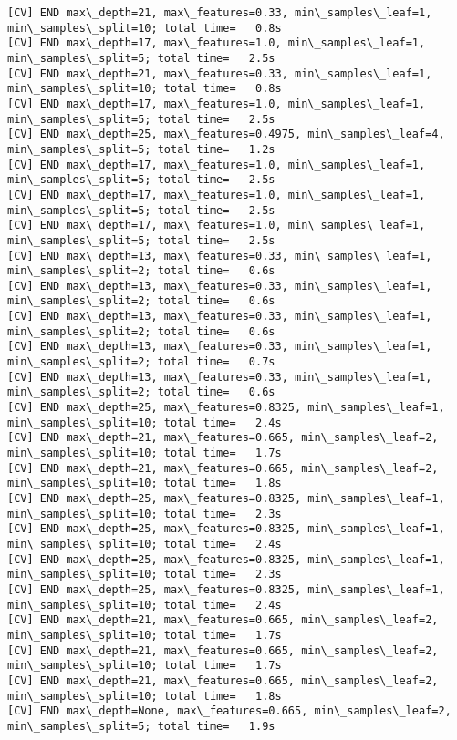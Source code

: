 \documentclass[11pt]{article}
\begin{document}
\begin{Verbatim}[commandchars=\\\{\}]
[CV] END max\_depth=21, max\_features=0.33, min\_samples\_leaf=1,
min\_samples\_split=10; total time=   0.8s
[CV] END max\_depth=17, max\_features=1.0, min\_samples\_leaf=1,
min\_samples\_split=5; total time=   2.5s
[CV] END max\_depth=21, max\_features=0.33, min\_samples\_leaf=1,
min\_samples\_split=10; total time=   0.8s
[CV] END max\_depth=17, max\_features=1.0, min\_samples\_leaf=1,
min\_samples\_split=5; total time=   2.5s
[CV] END max\_depth=25, max\_features=0.4975, min\_samples\_leaf=4,
min\_samples\_split=5; total time=   1.2s
[CV] END max\_depth=17, max\_features=1.0, min\_samples\_leaf=1,
min\_samples\_split=5; total time=   2.5s
[CV] END max\_depth=17, max\_features=1.0, min\_samples\_leaf=1,
min\_samples\_split=5; total time=   2.5s
[CV] END max\_depth=17, max\_features=1.0, min\_samples\_leaf=1,
min\_samples\_split=5; total time=   2.5s
[CV] END max\_depth=13, max\_features=0.33, min\_samples\_leaf=1,
min\_samples\_split=2; total time=   0.6s
[CV] END max\_depth=13, max\_features=0.33, min\_samples\_leaf=1,
min\_samples\_split=2; total time=   0.6s
[CV] END max\_depth=13, max\_features=0.33, min\_samples\_leaf=1,
min\_samples\_split=2; total time=   0.6s
[CV] END max\_depth=13, max\_features=0.33, min\_samples\_leaf=1,
min\_samples\_split=2; total time=   0.7s
[CV] END max\_depth=13, max\_features=0.33, min\_samples\_leaf=1,
min\_samples\_split=2; total time=   0.6s
[CV] END max\_depth=25, max\_features=0.8325, min\_samples\_leaf=1,
min\_samples\_split=10; total time=   2.4s
[CV] END max\_depth=21, max\_features=0.665, min\_samples\_leaf=2,
min\_samples\_split=10; total time=   1.7s
[CV] END max\_depth=21, max\_features=0.665, min\_samples\_leaf=2,
min\_samples\_split=10; total time=   1.8s
[CV] END max\_depth=25, max\_features=0.8325, min\_samples\_leaf=1,
min\_samples\_split=10; total time=   2.3s
[CV] END max\_depth=25, max\_features=0.8325, min\_samples\_leaf=1,
min\_samples\_split=10; total time=   2.4s
[CV] END max\_depth=25, max\_features=0.8325, min\_samples\_leaf=1,
min\_samples\_split=10; total time=   2.3s
[CV] END max\_depth=25, max\_features=0.8325, min\_samples\_leaf=1,
min\_samples\_split=10; total time=   2.4s
[CV] END max\_depth=21, max\_features=0.665, min\_samples\_leaf=2,
min\_samples\_split=10; total time=   1.7s
[CV] END max\_depth=21, max\_features=0.665, min\_samples\_leaf=2,
min\_samples\_split=10; total time=   1.7s
[CV] END max\_depth=21, max\_features=0.665, min\_samples\_leaf=2,
min\_samples\_split=10; total time=   1.8s
[CV] END max\_depth=None, max\_features=0.665, min\_samples\_leaf=2,
min\_samples\_split=5; total time=   1.9s

\end{Verbatim}
\end{document}
